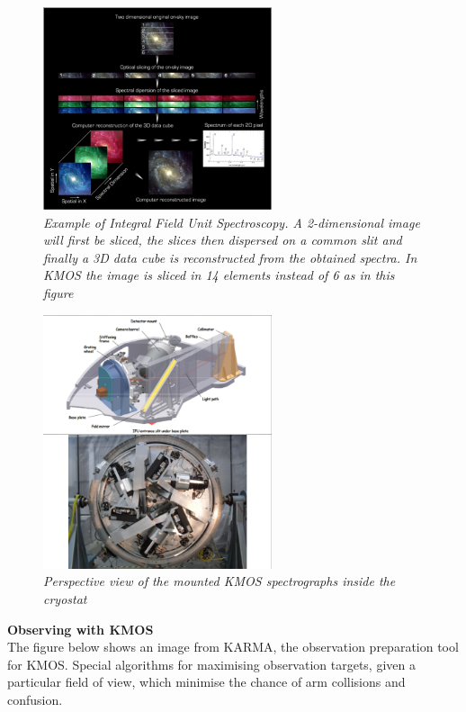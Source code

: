 \documentclass{literature}
\begin{document}
\begin{figure}[!htp]
\centering
\includegraphics[width=0.6\textwidth]{kmos_disperse.png}
\caption{\footnotesize{\emph{Example of Integral Field Unit Spectroscopy. A 2-dimensional image will first be sliced, the slices then dispersed on a common slit and finally a 3D data cube is reconstructed from the obtained spectra. In KMOS the image is sliced in 14 elements instead of 6 as in this figure}}}
\label{fig:kmos_disperse}
\end{figure}

\begin{figure}[!htp]
\centering
\includegraphics[width=0.6\textwidth]{kmos_speectrographs.png}
\caption{\footnotesize{\emph{Perspective view of the mounted KMOS spectrographs inside the cryostat}}}
\label{fig:kmos_spectrographs}
\end{figure}




\textbf{Observing with KMOS} \\

The figure below shows an image from KARMA, the observation preparation tool for KMOS. Special algorithms for maximising observation targets, given a particular field of view, which minimise the chance of arm collisions and confusion.
\end{document}
